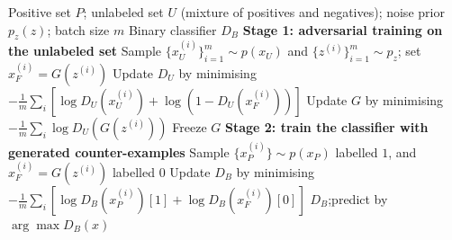 \documentclass{article}
\begin{document}
\begin{algorithm}[!h]
\renewcommand{\algorithmicrequire}{\textbf{Input:}}
\renewcommand{\algorithmicensure}{\textbf{Output:}}
	\caption{PGAN: learning a binary classifier from a PU dataset with a GAN}
	\begin{algorithmic}[1]
	    \REQUIRE
	    Positive set $P$; unlabeled set $U$ (mixture of positives and negatives);
	    noise prior $p_{z}(z)$; batch size $m$
	    \ENSURE
	    Binary classifier $D_{B}$
	    \STATE \textbf{Stage 1: adversarial training on the unlabeled set}
	    \STATE Sample $\{x_{U}^{(i)}\}_{i=1}^{m}\sim p(x_{U})$ and $\{z^{(i)}\}_{i=1}^{m}\sim p_{z}$;
	    set $x_{F}^{(i)}=G(z^{(i)})$
	    \STATE Update $D_{U}$ by minimising
	    $-\frac{1}{m}\sum_{i}\left[\log D_{U}(x_{U}^{(i)})+\log\!\left(1-D_{U}(x_{F}^{(i)})\right)\right]$
	    \STATE Update $G$ by minimising
	    $-\frac{1}{m}\sum_{i}\log D_{U}(G(z^{(i)}))$ %
	    \ENDFOR
	    \STATE Freeze $G$
	    \STATE \textbf{Stage 2: train the classifier with generated counter-examples}
	    \STATE Sample $\{x_{P}^{(i)}\}\sim p(x_{P})$ labelled $1$, and
	    $x_{F}^{(i)}=G(z^{(i)})$ labelled $0$ %
	    \STATE Update $D_{B}$ by minimising
	    $-\frac{1}{m}\sum_{i}\left[\log D_{B}(x_{P}^{(i)})[1]+\log D_{B}(x_{F}^{(i)})[0]\right]$
	    \ENDFOR
		\RETURN $D_{B}$;\quad predict by $\arg\max D_{B}(x)$
	\end{algorithmic}
\end{algorithm}
%
\end{document}
